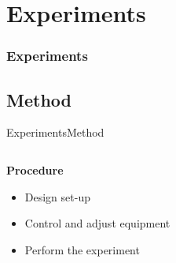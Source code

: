 \section{Experiments}
\begin{frame}
	\frametitle{Experiments}
	\tableofcontents[currentsection]
\end{frame}



\subsection{Method}
\begin{frame}{Experiments}{Method}		
	\begin{columns}
		\begin{column}{0.5\textwidth}
		\textbf{Procedure}
			\begin{itemize}
				\item Design set-up
				\item Control and adjust equipment
				\item Perform the experiment
			\end{itemize}	
			
		\end{column}
		\begin{column}{0.5\textwidth} 
		
		\end{column}
	\end{columns}
\end{frame}

